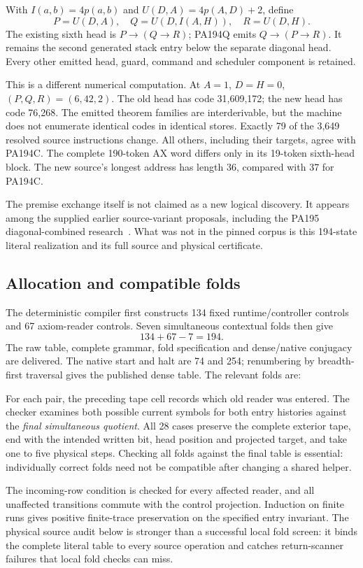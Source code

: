 \documentclass[11pt,letterpaper]{article}
\begin{document}
With $I(a,b)=4p(a,b)$ and $U(D,A)=4p(A,D)+2$, define
\[
 P=U(D,A),\quad Q=U(D,I(A,H)),\quad R=U(D,H).
\]
The existing sixth head is $P\to(Q\to R)$; PA194Q emits
$Q\to(P\to R)$. It remains the second generated stack entry below the
separate diagonal head. Every other emitted head, guard, command and
scheduler component is retained.

This is a different numerical computation. At $A=1$, $D=H=0$,
$(P,Q,R)=(6,42,2)$. The old head has code 31,609,172; the new head has
code 76,268. The emitted theorem families are interderivable, but the
machine does not enumerate identical codes in identical stores.
Exactly 79 of the 3,649 resolved source instructions change. All others,
including their targets, agree with PA194C. The complete 190-token AX word
differs only in its 19-token sixth-head block. The new source's longest
address has length 36, compared with 37 for PA194C.

The premise exchange itself is not claimed as a new logical discovery.
It appears among the supplied earlier source-variant proposals, including
the PA195 diagonal-combined research~\cite{source-variants}. What was not
in the pinned corpus is this 194-state literal realization and its full
source and physical certificate.

\subsection{Allocation and compatible folds}

The deterministic compiler first constructs 134 fixed runtime/controller
controls and 67 axiom-reader controls. Seven simultaneous contextual folds
then give
\[
                      134+67-7=194.
\]
The raw table, complete grammar, fold specification and dense/native
conjugacy are delivered. The native start and halt are 74 and 254;
renumbering by breadth-first traversal gives the published dense table.
The relevant folds are:


For each pair, the preceding tape cell records which old reader was
entered. The checker examines both possible current symbols for both
entry histories against the \emph{final simultaneous quotient}. All
28 cases preserve the complete exterior tape, end with the intended
written bit, head position and projected target, and take one to five
physical steps. Checking all folds against the final table is essential:
individually correct folds need not be compatible after changing a
shared helper.

The incoming-row condition is checked for every affected reader, and
all unaffected transitions commute with the control projection.
Induction on finite runs gives positive finite-trace preservation on the
specified entry invariant. The physical source audit below is stronger
than a successful local fold screen: it binds the complete literal table
to every source operation and catches return-scanner failures that local
fold checks can miss.
\end{document}

